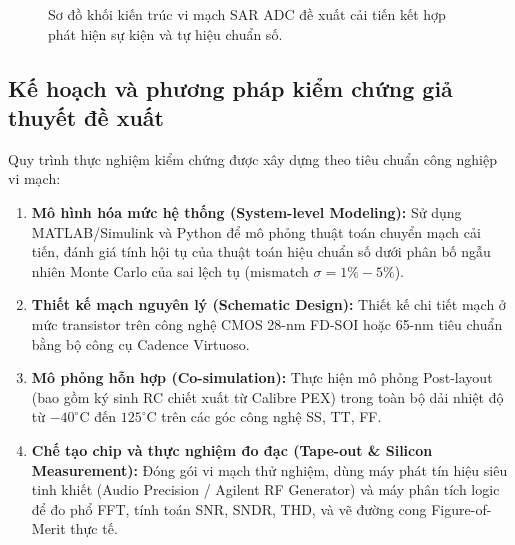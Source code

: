 \documentclass[12pt,a4paper]{article}
\begin{document}
\begin{figure}[H]
\caption{Sơ đồ khối kiến trúc vi mạch SAR ADC đề xuất cải tiến kết hợp phát hiện sự kiện và tự hiệu chuẩn số.}
\label{fig:proposed_architecture}
\end{figure}

\subsection{Kế hoạch và phương pháp kiểm chứng giả thuyết đề xuất}
Quy trình thực nghiệm kiểm chứng được xây dựng theo tiêu chuẩn công nghiệp vi mạch:
\begin{enumerate}
    \item \textbf{Mô hình hóa mức hệ thống (System-level Modeling):} Sử dụng MATLAB/Simulink và Python để mô phỏng thuật toán chuyển mạch cải tiến, đánh giá tính hội tụ của thuật toán hiệu chuẩn số dưới phân bố ngẫu nhiên Monte Carlo của sai lệch tụ (mismatch $\sigma = 1\% - 5\%$).
    \item \textbf{Thiết kế mạch nguyên lý (Schematic Design):} Thiết kế chi tiết mạch ở mức transistor trên công nghệ CMOS 28-nm FD-SOI hoặc 65-nm tiêu chuẩn bằng bộ công cụ Cadence Virtuoso.
    \item \textbf{Mô phỏng hỗn hợp (Co-simulation):} Thực hiện mô phỏng Post-layout (bao gồm ký sinh RC chiết xuất từ Calibre PEX) trong toàn bộ dải nhiệt độ từ $-40^\circ\text{C}$ đến $125^\circ\text{C}$ trên các góc công nghệ SS, TT, FF.
    \item \textbf{Chế tạo chip và thực nghiệm đo đạc (Tape-out \& Silicon Measurement):} Đóng gói vi mạch thử nghiệm, dùng máy phát tín hiệu siêu tinh khiết (Audio Precision / Agilent RF Generator) và máy phân tích logic để đo phổ FFT, tính toán SNR, SNDR, THD, và vẽ đường cong Figure-of-Merit thực tế.
\end{enumerate}
\end{document}
